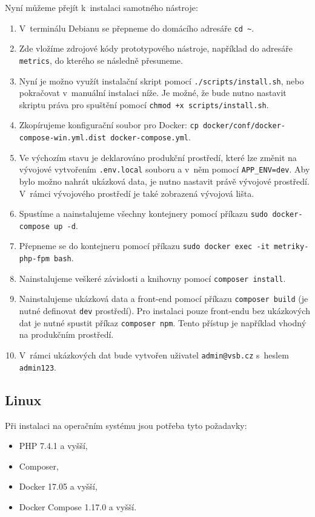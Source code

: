 \documentclass[czech,master]{diploma}
\begin{document}
Nyní můžeme přejít k~instalaci samotného nástroje:
\begin{enumerate}
\item V~terminálu Debianu se přepneme do domácího adresáře \texttt{cd \textasciitilde}.
\item Zde vložíme zdrojové kódy prototypového nástroje, například do adresáře \texttt{metrics}, do kterého se následně přesuneme.
\item Nyní je možno využít instalační skript pomocí \texttt{./scripts/install.sh}, nebo pokračovat v~manuální instalaci níže. Je možné, že bude nutno nastavit skriptu práva pro spuštění pomocí \texttt{chmod +x scripts/install.sh}.
\item Zkopírujeme konfigurační soubor pro Docker: \texttt{cp docker/conf/docker-compose-win.yml.dist docker-compose.yml}.
\item Ve výchozím stavu je deklarováno produkční prostředí, které lze změnit na vývojové vytvořením \texttt{.env.local} souboru a v~něm pomocí \texttt{APP\_ENV=dev}.  Aby bylo možno nahrát ukázková data, je nutno nastavit právě vývojové prostředí. V~rámci vývojového prostředí je také zobrazená vývojová lišta.
\item Spustíme a nainstalujeme všechny kontejnery pomocí příkazu \texttt{sudo docker-compose up -d}.
\item Přepneme se do kontejneru pomocí příkazu \texttt{sudo docker exec -it metriky-php-fpm bash}.
\item Nainstalujeme veškeré závislosti a knihovny pomocí \texttt{composer install}.
\item Nainstalujeme ukázková data a front-end pomocí příkazu \texttt{composer build} (je nutné definovat \texttt{dev} prostředí). Pro instalaci pouze front-endu bez ukázkových dat je nutné spustit příkaz \texttt{composer npm}. Tento přístup je například vhodný na produkčním prostředí.
\item V~rámci ukázkových dat bude vytvořen uživatel \texttt{admin@vsb.cz} s~heslem \texttt{admin123}.
\end{enumerate}

\subsection{Linux}
Při instalaci na operačním systému jsou potřeba tyto požadavky:
\begin{itemize}
\item PHP 7.4.1 a vyšší,
\item Composer,
\item Docker 17.05 a vyšší,
\item Docker Compose 1.17.0 a vyšší.
\end{itemize}
 
\end{document}
